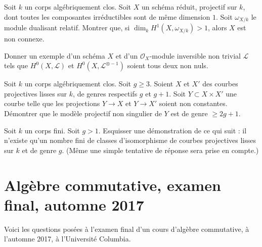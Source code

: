 \begin{exercise}
\label{exercise-count-components}
Soit $k$ un corps algébriquement clos. Soit $X$ un schéma réduit,
projectif sur $k$, dont toutes les composantes irréductibles
sont de même dimension $1$. Soit $\omega_{X/k}$ le
module dualisant relatif. Montrer que, si
$\dim_k H^1(X, \omega_{X/k}) > 1$, alors $X$ est non connexe.
\end{exercise}

\begin{exercise}
\label{exercise-sections-L-L-inverse}
Donner un exemple d'un schéma $X$ et d'un
$\mathcal{O}_X$-module inversible non trivial $\mathcal{L}$ tels que
$H^0(X, \mathcal{L})$ et $H^0(X, \mathcal{L}^{\otimes -1})$
soient tous deux non nuls.
\end{exercise}

\begin{exercise}
\label{exercise-in-product}
Soit $k$ un corps algébriquement clos. Soit $g \geq 3$.
Soient $X$ et $X'$ des courbes projectives lisses sur $k$, de
genres respectifs $g$ et $g + 1$. Soit $Y \subset X \times X'$
une courbe telle que les projections $Y \to X$ et $Y \to X'$
soient non constantes. Démontrer que le modèle projectif non singulier
de $Y$ est de genre $\geq 2g + 1$.
\end{exercise}

\begin{exercise}
\label{exercise-finitely-many}
Soit $k$ un corps fini. Soit $g > 1$. Esquisser une démonstration de ce qui suit :
il n'existe qu'un nombre fini de classes d'isomorphisme de
courbes projectives lisses sur $k$ et de genre $g$.
(Même une simple tentative de réponse sera prise en compte.)
\end{exercise}







\section{Algèbre commutative, examen final, automne 2017}
\label{section-final-exam-fall-2017}

\noindent
Voici les questions posées à l'examen final d'un cours d'algèbre commutative,
à l'automne 2017, à l'Université Columbia.

